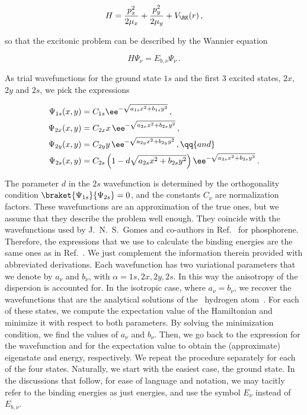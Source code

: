 \begin{equation}
    H = \frac{p_{x}^{2}}{2\mu_{x}}+\frac{p_{y}^{2}}{2\mu_{y}}+V_{\RK}(r)\,,
\end{equation}

\noindent so that the excitonic problem can be described by the Wannier equation

\begin{equation}
    H \Psi_{\nu} = E_{b,\nu} \Psi_{\nu}\,.
\end{equation}

As trial wavefunctions for the ground state $1s$ and the first 3 excited states, $2x$, $2y$ and $2s$, we pick the expressions

\begin{equation*}
\begin{split}
   \Psi_{1s}(x,y)&=C_{1s} \ee^{-\sqrt{a_{1s} x^{2} + b_{1s} y^{2}}} \,,\\
   \Psi_{2x}(x,y)&=C_{2x} x\, \ee^{-\sqrt{a_{2x} x^{2} + b_{2x} y^{2}}} \,,\\
   \Psi_{2y}(x,y)&=C_{2y} y\, \ee^{-\sqrt{a_{2y} x^{2} + b_{2y} y^{2}}} \,, \qq{and}\\
   \Psi_{2s}(x,y)&=C_{2s} \left(1-d \sqrt{a_{2s} x^{2} + b_{2s} y^{2}}\right) \ee^{-\sqrt{a_{2s} x^{2} + b_{2s} y^{2}}}\,.\\
\end{split}
\end{equation*}

\noindent The parameter $d$ in the $2s$ wavefunction is determined by the orthogonality condition $\braket{ \Psi_{1s}}{\Psi_{2s}}=0$, and the constants $C_{\nu}$ are normalization factors.
These wavefunctions are an approximation of the true ones, but we assume that they describe the problem well enough.
They coincide with the wavefunctions used by J.~N.~S.~Gomes and co-authors in Ref.~\cite{Gomes_Trallero-Giner_Vasilevskiy_2021} for phosphorene.
Therefore, the expressions that we use to calculate the binding energies are the same ones as in Ref.~\cite{Gomes_Trallero-Giner_Vasilevskiy_2021}.
We just complement the information therein provided with abbreviated derivations.
Each wavefunction has two variational parameters that we denote by $a_\nu$ and $b_\nu$, with $\alpha = 1s, 2x, 2y, 2s$.
In this way the anisotropy of the dispersion is accounted for.
In the isotropic case, where $a_\nu = b_\nu$, we recover the wavefunctions that are the analytical solutions of the \bd~hydrogen atom~\cite{2D_Hydrogen_atom_1991}.
For each of these states, we compute the expectation value of the Hamiltonian and minimize it with respect to both parameters.
By solving the minimization condition, we find the values of $a_\nu$ and $b_\nu$.
Then, we go back to the expression for the wavefunction and for the expectation value to obtain the (approximate) eigenstate and energy, respectively.
We repeat the procedure separately for each of the four states.
Naturally, we start with the easiest case, the ground state.
In the discussions that follow, for ease of language and notation, we may tacitly refer to the binding energies as just energies, and use the symbol $E_{\nu}$ instead of $E_{b,\nu}$.

